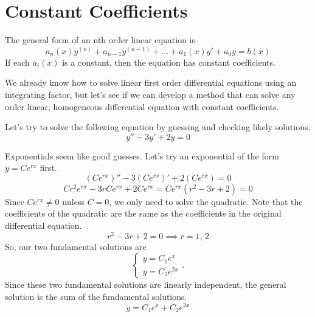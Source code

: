 \section{Constant Coefficients}
\begin{definition}
	The general form of an nth order linear equation is
	\begin{equation*}
		a_n(x)y^{(n)} + a_{n-1}y^{(n-1)} + \ldots + a_1(x)y' + a_0y = b(x)
	\end{equation*}
	If each $a_i(x)$ is a constant, then the equation has constant coefficients.
\end{definition}

\noindent
We already know how to solve linear first order differential equations using an integrating factor, but let's see if we can develop a method that can solve any order linear, homogeneous differential equation with constant coefficients.

\begin{example}
	Let's try to solve the following equation by guessing and checking likely solutions.
	\begin{equation*}
		y'' - 3y' + 2y = 0
	\end{equation*}
\end{example}
\noindent
Exponentials seem like good guesses. Let's try an exponential of the form $y = Ce^{rx}$ first.
\begin{equation*}
	\left(Ce^{rx}\right)'' - 3\left(Ce^{rx}\right)' + 2\left(Ce^{rx}\right) =  0
\end{equation*}
\begin{equation*}
	Cr^2e^{rx} - 3rCe^{rx} + 2Ce^{rx} = Ce^{rx}\left(r^2 - 3r + 2\right) = 0
\end{equation*}
Since $Ce^{rx} \neq 0$ unless $C = 0$, we only need to solve the quadratic.
Note that the coefficients of the quadratic are the same as the coefficients in the original differential equation.
\begin{equation*}
	r^2 - 3r + 2 = 0 \implies r = 1 \text{, } 2
\end{equation*}
So, our two fundamental solutions are
\begin{equation*}
	\begin{cases}
		y = C_1e^{x} \\
		y = C_2e^{2x}
	\end{cases}.
\end{equation*}
Since these two fundamental solutions are linearly independent, the general solution is the sum of the fundamental solutions.
\begin{equation*}
	y = C_1e^{x} + C_2e^{2x}
\end{equation*}

